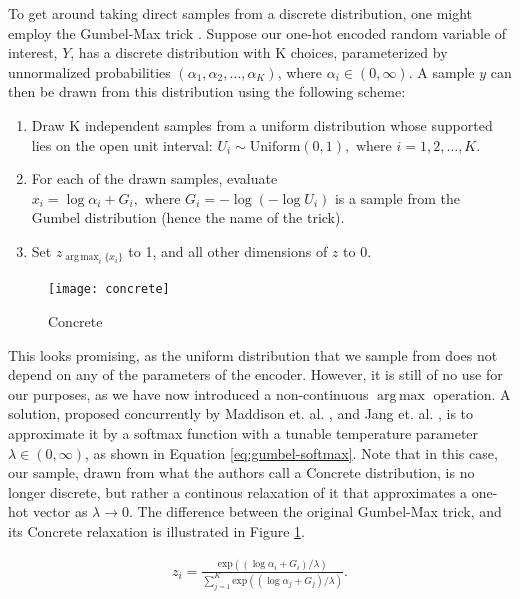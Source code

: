 \documentclass{report}
\DeclareMathOperator*{\argmax}{arg\,max}
\begin{document}
\noindent To get around taking direct samples from a discrete distribution, one might employ the Gumbel-Max trick \cite{Luce59}. Suppose our one-hot encoded random variable of interest, $Y$, has a discrete distribution with K choices, parameterized by unnormalized probabilities $(\alpha_1, \alpha_2, \dots, \alpha_K)$, where $\alpha_i \in (0, \infty)$. A sample $y$ can then be drawn from this distribution using the following scheme:

\begin{enumerate}
  \item Draw K independent samples from a uniform distribution whose supported lies on the open unit interval: $U_i \sim \text{Uniform}(0, 1), \text{ where } i = 1, 2, \dots, K$.
  \item For each of the drawn samples, evaluate $x_i = \log \alpha_i + G_i, \text{ where } G_i = -\log(-\log U_i)$ is a sample from the Gumbel distribution (hence the name of the trick).
  \item Set $z_{\argmax_i \{x_i\}}$ to 1, and all other dimensions of $z$ to 0.
\end{enumerate}

\begin{figure}
\begin{center}
\texttt{[image: concrete]}
\caption{Concrete}
\label{fig:concrete}
\end{center}
\end{figure}

\bigskip

\noindent This looks promising, as the uniform distribution that we sample from does not depend on any of the parameters of the encoder. However, it is still of no use for our purposes, as we have now introduced a non-continuous $\argmax$ operation. A solution, proposed concurrently by Maddison et. al. \cite{concrete}, and Jang et. al. \cite{gumbel-softmax}, is to approximate it by a softmax function with a tunable temperature parameter $\lambda \in (0, \infty)$, as shown in Equation \ref{eq:gumbel-softmax}. Note that in this case, our sample, drawn from what the authors call a Concrete distribution, is no longer discrete, but rather a continous relaxation of it that approximates a one-hot vector as $\lambda \rightarrow 0$. The difference between the original Gumbel-Max trick, and its Concrete relaxation is illustrated in Figure \ref{fig:concrete}.

\begin{equation}
\begin{gathered}
z_i = \frac{\text{exp}((\log \alpha_i + G_i) / \lambda)}{\sum_{j=1}^K \text{exp}((\log \alpha_j + G_j) / \lambda)}.
\end{gathered}
\label{eq:gumbel-softmax}
\end{equation}
\end{document}
